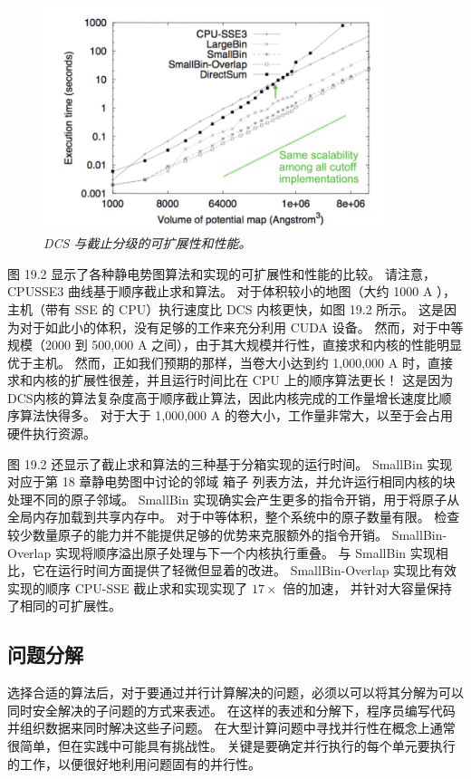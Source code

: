 \begin{figure}[H]
	\centering
	\includegraphics[width=0.9\textwidth]{figs/F19.2.png}
	\caption{\textit{DCS 与截止分级的可扩展性和性能。}}
\end{figure}

图 19.2 显示了各种静电势图算法和实现的可扩展性和性能的比较。 请注意，CPUSSE3 曲线基于顺序截止求和算法。 
对于体积较小的地图（大约 1000 A ），主机（带有 SSE 的 CPU）执行速度比 DCS 内核更快，如图 19.2 所示。 
这是因为对于如此小的体积，没有足够的工作来充分利用 CUDA 设备。 
然而，对于中等规模（2000 到 500,000 A 之间），由于其大规模并行性，直接求和内核的性能明显优于主机。 
然而，正如我们预期的那样，当卷大小达到约 1,000,000 A 时，直接求和内核的扩展性很差，并且运行时间比在 CPU 上的顺序算法更长！ 
这是因为DCS内核的算法复杂度高于顺序截止算法，因此内核完成的工作量增长速度比顺序算法快得多。 
对于大于 1,000,000 A 的卷大小，工作量非常大，以至于会占用硬件执行资源。

图 19.2 还显示了截止求和算法的三种基于分箱实现的运行时间。 
SmallBin 实现对应于第 18 章静电势图中讨论的邻域 箱子 列表方法，并允许运行相同内核的块处理不同的原子邻域。 
SmallBin 实现确实会产生更多的指令开销，用于将原子从全局内存加载到共享内存中。 
对于中等体积，整个系统中的原子数量有限。 检查较少数量原子的能力并不能提供足够的优势来克服额外的指令开销。 
SmallBin-Overlap 实现将顺序溢出原子处理与下一个内核执行重叠。 
与 SmallBin 实现相比，它在运行时间方面提供了轻微但显着的改进。 
SmallBin-Overlap 实现比有效实现的顺序 CPU-SSE 截止求和实现实现了 $17\times$ 倍的加速，
并针对大容量保持了相同的可扩展性。

\subsection{问题分解}
选择合适的算法后，对于要通过并行计算解决的问题，必须以可以将其分解为可以同时安全解决的子问题的方式来表述。 
在这样的表述和分解下，程序员编写代码并组织数据来同时解决这些子问题。 
在大型计算问题中寻找并行性在概念上通常很简单，但在实践中可能具有挑战性。 
关键是要确定并行执行的每个单元要执行的工作，以便很好地利用问题固有的并行性。


